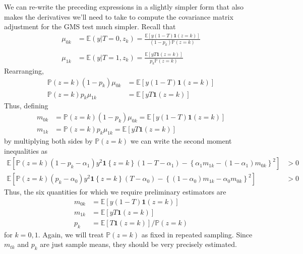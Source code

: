 \documentclass[12pt]{article}
\begin{document}
We can re-write the preceding expressions in a slightly simpler form that also makes the derivatives we'll need to take to compute the covariance matrix adjustment for the GMS test much simpler. 
Recall that 
\begin{align*}
  \mu_{0k} &= \mathbb{E}\left( y|T=0, z_k \right) = \frac{\mathbb{E}\left[ y(1 - T) \mathbf{1}(z=k) \right]}{(1 - p_k) \mathbb{P}(z=k)}\\ \\
  \mu_{1k} &= \mathbb{E}\left( y|T=1, z_k \right) = \frac{\mathbb{E}\left[ yT \mathbf{1}(z=k) \right]}{p_k \mathbb{P}(z=k)}
\end{align*}
Rearranging,
\begin{align*}
  \mathbb{P}(z=k)(1-p_k)\mu_{0k} &=  \mathbb{E}\left[ y(1 - T) \mathbf{1}(z=k) \right]\\
  \mathbb{P}(z=k)p_k\mu_{1k} &= \mathbb{E}\left[ yT \mathbf{1}(z=k) \right]
\end{align*}
Thus, defining
\begin{align*}
  m_{0k} &= \mathbb{P}(z=k)(1-p_k)\mu_{0k} =  \mathbb{E}\left[ y(1 - T) \mathbf{1}(z=k) \right]\\
  m_{1k} &= \mathbb{P}(z=k)p_k\mu_{1k} = \mathbb{E}\left[ yT \mathbf{1}(z=k) \right]
\end{align*}
by multiplying both sides by $\mathbb{P}(z=k)$ we can write the second moment inequalities as
\begin{align*}
  \mathbb{E}\left[\mathbb{P}(z=k) (1- p_k - \alpha_1) y^2 \mathbf{1}\left\{ z=k \right\}(1 - T - \alpha_1) - \left\{ \alpha_1 m_{1k} - (1 - \alpha_1)m_{0k} \right\}^2 \right] &>0 \\
  \mathbb{E}\left[ \mathbb{P}(z=k)(p_k - \alpha_0) y^2 \mathbf{1}\left\{ z=k \right\}(T - \alpha_0) - \left\{ (1 - \alpha_0) m_{1k} - \alpha_0 m_{0k} \right\}^2 \right] &>0 
\end{align*}
Thus, the six quantities for which we require preliminary estimators are
\begin{align*}
  m_{0k} &= \mathbb{E}\left[ y(1 - T) \mathbf{1}(z=k) \right]\\
  m_{1k} &= \mathbb{E}\left[ yT \mathbf{1}(z=k) \right]\\
  p_k &= \mathbb{E}[T\mathbf{1}(z=k)] / \mathbb{P}(z=k)
\end{align*}
for $k = 0, 1$.
Again, we will treat $\mathbb{P}(z=k)$ as fixed in repeated sampling.
Since $m_{tk}$ and $p_k$ are just sample means, they should be very precisely estimated.
\end{document}
